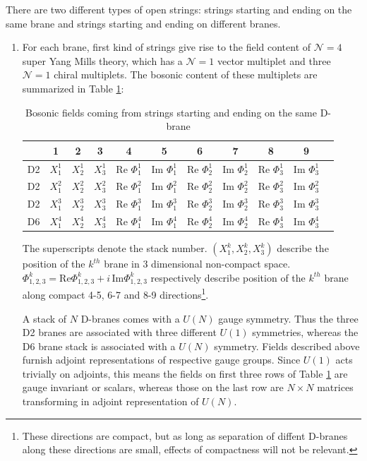\documentclass[12pt,a4paper]{JHEP3}
\begin{document}
There are two different types of open strings: strings starting and ending on the same brane and strings starting and ending on different branes.
\begin{enumerate}
\item
For each brane, first kind of strings give rise to the field content of $\mathcal{N}=4$ super  Yang Mills theory, which has a $\mathcal{N}=1$ vector multiplet and three $\mathcal{N}=1$ chiral multiplets. The bosonic content of these multiplets are summarized in Table \ref{adjfield}:
%
%
\begin{table}[htb]
\begin{center}
\begin{tabular}{|c||c|c|c|c|c|c|c|c|c|c}
\hline
& 1 & 2 & 3 & 4 & 5 & 6 & 7 & 8 & 9 \\
\hline
D2 & $X_1^{1}$ & $X_2^{1}$ & $X_3^{1}$ & Re $\Phi^1_1$ & Im $\Phi^1_1$ & Re $\Phi^1_2$ & Im $\Phi^1_2$ &  Re $\Phi^1_3$ &  Im $\Phi^1_3$ \\
\hline
D2 & $X_1^{2}$ & $X_2^{2}$ & $X_3^{2}$ & Re $\Phi^2_1$ & Im $\Phi^2_1$ & Re $\Phi^2_2$ &  Im $\Phi^2_2$ & Re $\Phi^2_3$ & Im $\Phi^2_3$ \\
\hline
D2 & $X_1^{3}$ & $X_2^{3}$ & $X_3^{3}$ & Re $\Phi^3_1$ & Im $\Phi^3_1$ &  Re $\Phi^3_2$ &  Im $\Phi^3_2$ & Re $\Phi^3_3$ & Im $\Phi^3_3$ \\
\hline
D6 & $X_1^{4}$ & $X_2^{4}$ & $X_3^{4}$ & Re $\Phi^4_1$ & Im $\Phi^4_1$ & Re $\Phi^4_2$ &  Im $\Phi^4_2$ & Re $\Phi^4_3$ & Im $\Phi^4_3$ \\
\hline
\end{tabular}
\end{center}
\caption{Bosonic fields coming from strings starting and ending on the same D-brane}\label{adjfield}
\end{table}
The superscripts denote the stack number. $(X_1^{k}, X_2^{k} , X_3^{k})$ describe the position of the $k^{th}$ brane in 3 dimensional non-compact space. $\Phi^k_{1,2,3} = \text{Re} \Phi^k_{1,2,3} + i \, \text{Im} \Phi^k_{1,2,3}$ respectively describe position of the $k^{th}$ brane along compact 4-5, 6-7 and 8-9 directions\footnote{These directions are compact, but as long as separation of diffent D-branes along  these directions are small, effects of compactness will not be relevant.}.


A stack of $N$ D-branes comes with a $U(N)$ gauge symmetry. Thus the three D2 branes are associated with three different $U(1)$ symmetries, whereas the D6 brane stack is associated with a $U(N)$ symmetry. Fields described above furnish adjoint representations of respective gauge groups. Since $U(1)$ acts trivially on adjoints, this means the fields on first three rows of Table \ref{adjfield} are gauge invariant or scalars, whereas those on the last row are $N \times N$ matrices transforming in adjoint representation of $U(N)$. 


\end{enumerate}
\end{document}
